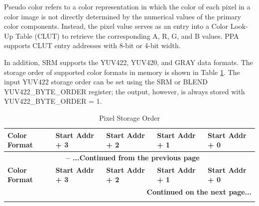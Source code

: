 \documentclass[main\_\_EN.tex]{subfiles}
\begin{document}
Pseudo color refers to a color representation in which the color of each pixel in a color image is not directly determined by the numerical values of the primary color components. Instead, the pixel value serves as an entry into a Color Look-Up Table (CLUT) to retrieve the corresponding A, R, G, and B values. PPA supports CLUT entry addresses with 8-bit or 4-bit width.

In addition, SRM supports the YUV422, YUV420, and GRAY data formats. The storage order of supported color formats in memory is shown in Table \ref{tab:color-space-endian}. The input YUV422 storage order can be set using the SRM or BLEND YUV422\_BYTE\_ORDER register; the output, however, is always stored with YUV422\_BYTE\_ORDER = 1.

\begin{longtable}[c]{ |p{2.5cm}|p{2.5cm}|p{2.5cm}|p{2.5cm}|p{2.5cm}| }
    \caption{Pixel Storage Order}
    \label{tab:color-space-endian}\\\hline

    \rowcolor{lightgray}
    \textbf{Color Format} & \textbf{Start Addr + 3} & \textbf{Start Addr + 2} & \textbf{Start Addr + 1} & \textbf{Start Addr + 0} \\\hline
    \endfirsthead


    \multicolumn{5}{c}{\bfseries \tablename\ \thetable{} -- ...Continued from the previous page}\\\hline
    \rowcolor{lightgray}
    \textbf{Color Format} & \textbf{Start Addr + 3} & \textbf{Start Addr + 2} & \textbf{Start Addr + 1} & \textbf{Start Addr + 0} \\\hline
    \endhead

    \multicolumn{5}{r}{\textbf{Continued on the next page...}} \\
    \endfoot

    \endlastfoot


\end{longtable}
\end{document}
